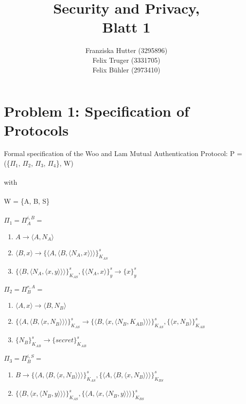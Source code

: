 \documentclass[12pt,pdftex,a4paper]{article}
\title{Security and Privacy,\\ Blatt 1}
\author{Franziska Hutter (3295896)\\
	Felix Truger (3331705)\\
	Felix Bühler (2973410)}
\newcommand\tab[1][1cm]{\hspace*{#1}}
\begin{document}
\maketitle
\pagebreak

\section*{Problem 1: Specification of Protocols}
Formal specification of the Woo and Lam Mutual Authentication Protocol:
\linebreak\linebreak
P = (\{$\Pi_1$, $\Pi_2$, $\Pi_3$, $\Pi_4$\}, W)\\~\\
with\\~\\
W = \{A, B, S\}\\~\\

$\Pi_1 = \Pi_A^{i,B} =$
\begin{enumerate}
	\item \tab $ A \rightarrow \langle A, N_A\rangle $
	\item \tab $ \langle B, x \rangle \rightarrow \{\langle A, \langle B, \langle N_A, x\rangle\rangle\rangle\}_{K_{AS}}^s$	
	\item \tab $ \{\langle B,\langle N_A, \langle x, y\rangle\rangle\rangle\}_{K_{AS}}^{s}, \{\langle N_A, x\rangle\}_y^s \rightarrow \{x\}_y^s $
\end{enumerate} 

$\Pi_2 = \Pi_B^{r,A} =$
\begin{enumerate}
\item \tab $\langle A, x\rangle \rightarrow \langle B, N_B \rangle$
\item \tab $\{\langle A, \langle B, \langle x, N_B \rangle\rangle\rangle\}_{K_{AS}}^s
\rightarrow \{\langle B,\langle x, \langle N_B, K_{AB}\rangle\rangle\rangle\}_{K_{AS}}^{s}, \{\langle x, N_B\rangle\}_{K_{AB}}^s$
\item \tab $ \{N_B\}_{K_{AB}}^s \rightarrow \{secret\}_{K_{AB}}^s$
\end{enumerate}

$\Pi_3 = \Pi_B^{i,S} =$
\begin{enumerate}
\item \tab $ B \rightarrow \{\langle A, \langle B, \langle x, N_B \rangle\rangle\rangle\}_{K_{AS}}^s, \{\langle A, \langle B, \langle x, N_B \rangle\rangle\rangle\}_{K_{BS}}^s $
\item \tab $ \{\langle B, \langle x, \langle N_B, y\rangle\rangle\rangle\}_{K_{AS}}^s,\{\langle A, \langle x, \langle N_B, y\rangle\rangle\rangle\}_{K_{BS}}^s $
\end{enumerate}
\end{document}
